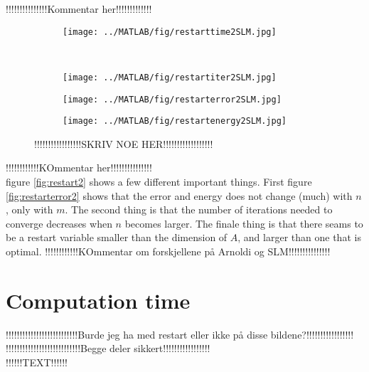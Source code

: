 !!!!!!!!!!!!!!!Kommentar her!!!!!!!!!!!!!\\
\begin{figure}[H]
        \centering
        \begin{subfigure}[b]{0.45\textwidth}
                \texttt{[image: ../MATLAB/fig/restarttime2SLM.jpg]}
                \caption{  }
                \label{fig:restarttime2SLM}
        \end{subfigure}
        ~
        \begin{subfigure}[b]{0.45\textwidth}
                \texttt{[image: ../MATLAB/fig/restartiter2SLM.jpg]}
                \caption{  }
                \label{fig:restartiter2SLM}
        \end{subfigure}
        \begin{subfigure}[b]{0.45\textwidth}
                \texttt{[image: ../MATLAB/fig/restarterror2SLM.jpg]}
                \caption{  }
                \label{fig:restarterror2SLM}
        \end{subfigure}
        \begin{subfigure}[b]{0.45\textwidth}
                \texttt{[image: ../MATLAB/fig/restartenergy2SLM.jpg]}
                \caption{  }
                \label{fig:restartenergy2SLM}
        \end{subfigure}
        \caption{ !!!!!!!!!!!!!!!!!SKRIV NOE HER!!!!!!!!!!!!!!!!!!  }
        \label{fig:restart2SLM}
\end{figure}
!!!!!!!!!!!!KOmmentar her!!!!!!!!!!!!!!!\\
figure \ref{fig:restart2} shows a few different important things. First figure \ref{fig:restarterror2} shows that the error and energy does not change (much) with $n$, only with $m$. The second thing is that the number of iterations needed to converge decreases when $n$ becomes larger. The finale thing is that there seams to be a restart variable smaller than the dimension of $A$, and larger than one that is optimal. 
!!!!!!!!!!!!KOmmentar om forskjellene på Arnoldi og SLM!!!!!!!!!!!!!!!\\

\section{Computation time}%
!!!!!!!!!!!!!!!!!!!!!!!!!!Burde jeg ha med restart eller ikke på disse bildene?!!!!!!!!!!!!!!!!!\\
!!!!!!!!!!!!!!!!!!!!!!!!!!!Begge deler sikkert!!!!!!!!!!!!!!!!!\\
!!!!!!TEXT!!!!!! \\


